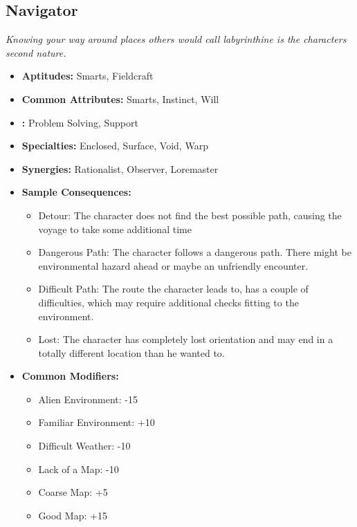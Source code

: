 \subsection{Navigator}\label{Navigator}
\textit{Knowing your way around places others would call labyrinthine is the characters second nature.}
\begin{itemize}
	\item \textbf{Aptitudes:} Smarts, Fieldcraft
	\item \textbf{Common Attributes:} Smarts, Instinct, Will
	\item \textbf{:} Problem Solving, Support
	\item \textbf{Specialties:} Enclosed, Surface, Void, Warp
	\item \textbf{Synergies:} Rationalist, Observer, Loremaster
	\item \textbf{Sample Consequences:} 
	\begin{itemize}
		\item Detour: The character does not find the best possible path, causing the voyage to take some additional time
		\item Dangerous Path: The character follows a dangerous path. There might be environmental hazard ahead or maybe an unfriendly encounter.
		\item Difficult Path: The route the character leads to, has a couple of difficulties, which may require additional checks fitting to the environment.
		\item Lost: The character has completely lost orientation and may end in a totally different location than he wanted to. 
	\end{itemize}
	\item \textbf{Common Modifiers:}
	\begin{itemize}
 		\item Alien Environment: -15
 		\item Familiar Environment: +10
 		\item Difficult Weather: -10
 		\item Lack of a Map: -10
 		\item Coarse Map: +5
 		\item Good Map: +15
	\end{itemize}
\end{itemize}

